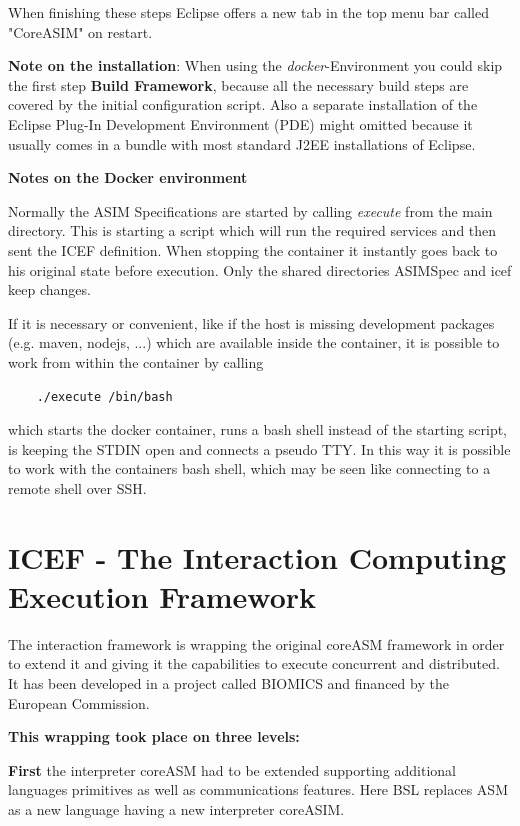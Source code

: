 When finishing these steps Eclipse offers a new tab in the top menu bar called "CoreASIM" on restart.

\textbf{Note on the installation}: When using the \textit{docker}-Environment you could skip the first step \textbf{Build Framework}, because all the necessary build steps are covered by the initial configuration script. Also a separate installation of the Eclipse Plug-In Development Environment (PDE) might omitted because it usually comes in a bundle with most standard J2EE installations of Eclipse.

\textbf{Notes on the Docker environment}
\label{sec_inner:note-docker}

Normally the ASIM Specifications are started by calling \textit{execute} from the main directory. This is starting a script which will run the required services and then sent the ICEF definition. When stopping the container it instantly goes back to his original state before execution. Only the shared directories ASIMSpec and icef keep changes.

If it is necessary or convenient, like if the host is missing development packages (e.g. maven, nodejs, ...) which are available inside the container, it is possible to work from within the container by calling

\begin{lstlisting}
	./execute /bin/bash
\end{lstlisting}

which starts the docker container, runs a bash shell instead of the starting script, is keeping the STDIN open and connects a pseudo TTY. In this way it is possible to work with the containers bash shell, which may be seen like connecting to a remote shell over SSH.

\section{ICEF - The Interaction Computing Execution Framework}
\label{sec:icef-intro}

The interaction framework is wrapping the original coreASM framework in order to extend it and giving it the capabilities to execute concurrent and distributed. It has been developed in a project called BIOMICS and financed by the European Commission.

\textbf{This wrapping took place on three levels:}

\textbf{First} the interpreter coreASM had to be extended supporting additional languages primitives as well as communications features. Here BSL replaces ASM as a new language having a new interpreter coreASIM.

